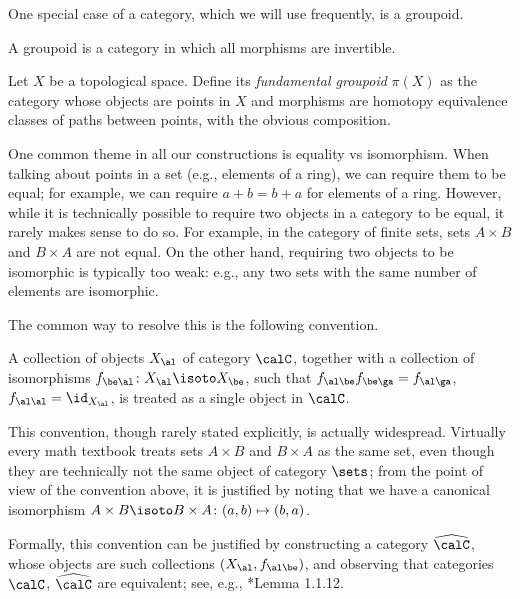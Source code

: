 One special case of a category, which we will use frequently, is a groupoid.
\begin{definition}
  A groupoid is a category in which all morphisms are invertible.
\end{definition}
\begin{example}
  Let $X$ be a topological space. Define its \emph{fundamental groupoid}
  $\pi(X)$ as the category whose objects are points in $X$ and morphisms
  are homotopy equivalence classes of paths between points, with the obvious
  composition.
\end{example}

One common theme in all our constructions is equality vs isomorphism. When
talking about points in a set (e.g., elements of a ring), we can require them to
be equal; for example, we can require $a+b=b+a$ for elements of a ring. However,
while it is technically possible to require two objects in a category to be
equal, it rarely makes sense to do so. For example, in the category of finite
sets, sets $A\times B$ and $B\times A$ are not equal. On the other hand,
requiring two objects to be isomorphic is typically too weak: e.g., any two sets
with the same number of elements are isomorphic.

The common way to resolve this is the following convention.
\begin{convention}\label{conv:canonical}
  A collection of objects $X_\al$ of category $\calC$, together with a
  collection of isomorphisms $f_{\be\al}\colon X_\al \isoto X_\be$, such that
  $f_{\al\be}f_{\be\ga}=f_{\al\ga}$, $f_{\al\al}=\id_{X_\al}$, is treated as a
  single object in $\calC$.
\end{convention}
This convention, though rarely stated explicitly, is actually widespread.
Virtually every math textbook treats sets $A\times B$ and $B\times A$ as the
same set, even though they are technically not the same object of category
$\sets$; from the point of view of the convention above, it is justified by
noting that we have a canonical isomorphism $A\times B\isoto B\times A\colon
(a,b)\mapsto (b,a)$.

Formally, this convention can be justified by constructing a category
$\widehat\calC$, whose objects are such collections $(X_\al, f_{\al\be})$, and
observing that categories $\calC$, $\widehat\calC$ are equivalent; see, e.g.,
*{Lemma 1.1.12}.


